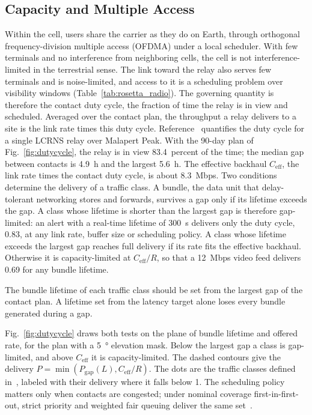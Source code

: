 \documentclass{IEEEoj}
\begin{document}
\subsection{Capacity and Multiple Access}
\label{sec:admissibility}
Within the cell, users share the carrier as they do on Earth, through orthogonal frequency-division multiple access (OFDMA) under a local scheduler. With few terminals and no interference from neighboring cells, the cell is not interference-limited in the terrestrial sense. The link toward the relay also serves few terminals and is noise-limited, and access to it is a scheduling problem over visibility windows (Table~\ref{tab:rosetta_radio}). The governing quantity is therefore the contact duty cycle, the fraction of time the relay is in view and scheduled. Averaged over the contact plan, the throughput a relay delivers to a site is the link rate times this duty cycle. Reference~\cite{baena2027lunabridge} quantifies the duty cycle for a single LCRNS relay over Malapert Peak. With the 90-day plan of Fig.~\ref{fig:dutycycle}, the relay is in view 83.4~percent of the time; the median gap between contacts is \SI{4.9}{h} and the largest \SI{5.6}{h}. The effective backhaul $C_{\mathrm{eff}}$, the link rate times the contact duty cycle, is about \SI{8.3}{Mbps}. Two conditions determine the delivery of a traffic class. A bundle, the data unit that delay-tolerant networking stores and forwards, survives a gap only if its lifetime exceeds the gap. A class whose lifetime is shorter than the largest gap is therefore gap-limited: an alert with a real-time lifetime of \SI{300}{s} delivers only the duty cycle, 0.83, at any link rate, buffer size or scheduling policy. A class whose lifetime exceeds the largest gap reaches full delivery if its rate fits the effective backhaul. Otherwise it is capacity-limited at $C_{\mathrm{eff}}/R$, so that a \SI{12}{Mbps} video feed delivers 0.69 for any bundle lifetime.

\begin{remark}
The bundle lifetime of each traffic class should be set from the largest gap of the contact plan. A lifetime set from the latency target alone loses every bundle generated during a gap.
\end{remark}

Fig.~\ref{fig:dutycycle} draws both tests on the plane of bundle lifetime and offered rate, for the plan with a \SI{5}{\degree} elevation mask. Below the largest gap a class is gap-limited, and above $C_{\mathrm{eff}}$ it is capacity-limited. The dashed contours give the delivery $P = \min(P_{\mathrm{gap}}(L), C_{\mathrm{eff}}/R)$. The dots are the traffic classes defined in~\cite{baena2027lunabridge}, labeled with their delivery where it falls below 1. The scheduling policy matters only when contacts are congested; under nominal coverage first-in-first-out, strict priority and weighted fair queuing deliver the same set~\cite{baena2027lunabridge}. 
\end{document}
